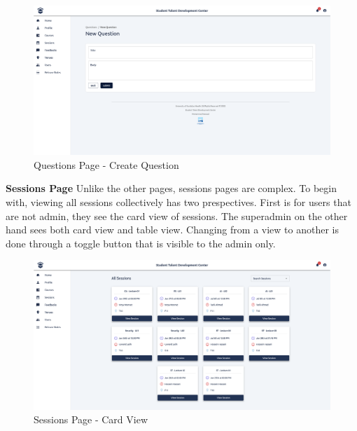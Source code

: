 \begin{justify}
    \begin{figure}[H]
        \centerline{\includegraphics[width=150mm,scale=1]{figures/implementation_and_testing/implementation/frontend/pages/Questions - Create.png}}
        \caption{Questions Page - Create Question}
    \end{figure}



    \clearpage
    \noindent \textbf{Sessions Page}\newendline
    Unlike the other pages, sessions pages are complex. To begin with, viewing all sessions collectively has two prespectives. First is for users that are not admin, they see the card view of sessions. The superadmin on the other hand sees both card view and table view. Changing from a view to another is done through a toggle button that is visible to the admin only.

    \begin{figure}[H]
        \centerline{\includegraphics[width=150mm,scale=1]{figures/implementation_and_testing/implementation/frontend/pages/Sessions - All.png}}
        \caption{Sessions Page - Card View}
    \end{figure}


\end{justify}
